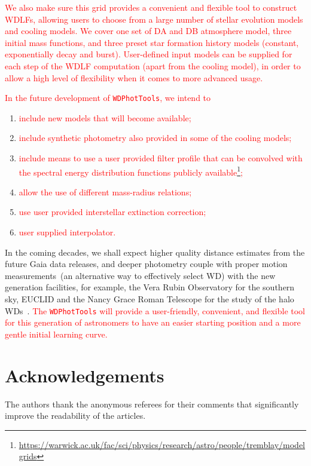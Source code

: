 \documentclass[fleqn,usenatbib]{rasti}
\begin{document}
\textcolor{red}{We also make sure this grid provides a convenient and flexible
tool to construct WDLFs, allowing users to choose from a large number of
stellar evolution models and cooling models. We cover one set of DA and DB
atmosphere model, three initial mass functions, and three preset star formation
history models (constant, exponentially decay and burst). User-defined input
models can be supplied for each step of the WDLF computation (apart from
the cooling model), in order to allow a high level of flexibility when it
comes to more advanced usage.

In the future development of \texttt{WDPhotTools}, we intend to}
\begin{enumerate}
    \item \textcolor{red}{include new models that will become available;}
    \item \textcolor{red}{include synthetic photometry also provided in some of the cooling models;}
    \item \textcolor{red}{include means to use a user provided filter profile that can be convolved with the spectral energy distribution functions publicly available\footnote{\url{https://warwick.ac.uk/fac/sci/physics/research/astro/people/tremblay/modelgrids}};}
    \item \textcolor{red}{allow the use of different mass-radius relations;}
    \item \textcolor{red}{use user provided interstellar extinction correction;}
    \item \textcolor{red}{user supplied interpolator.}
\end{enumerate}


In the coming decades, we shall expect higher quality distance estimates from
the future Gaia data releases, and deeper photometry couple with proper
motion measurements~(an alternative way to effectively select WD) with the
new generation facilities, for example, the Vera Rubin Observatory for the
southern sky, EUCLID and the Nancy Grace Roman Telescope for the study of the
halo WDs~\citep{2020ApJ...900..139F}. \textcolor{red}{The \texttt{WDPhotTools}
will provide a user-friendly, convenient, and flexible tool for this
generation of astronomers to have an easier starting position and a more
gentle initial learning curve.}

\section*{Acknowledgements}
The authors thank the anonymous referees for their comments that significantly
improve the readability of the articles.
\end{document}
